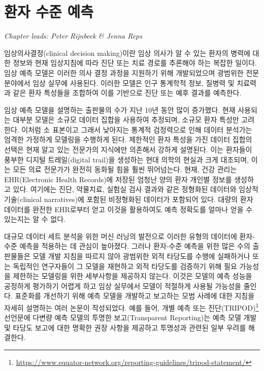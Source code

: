 \documentclass[10.5pt]{book}
\let\rmarkdownfootnote\footnote%
\def\footnote{\protect\rmarkdownfootnote}
\theoremstyle{definition}
\theoremstyle{definition}
\theoremstyle{definition}
\theoremstyle{remark}
\begin{document}
\chapter{환자 수준 예측}\label{PatientLevelPrediction}

\emph{Chapter leads: Peter Rijnbeek \& Jenna Reps}


임상의사결정(clinical decision making)이란 임상 의사가 알 수 있는 환자의
병력에 대한 정보와 현재 임상지침에 따라 진단 또는 치료 경로를 추론해야
하는 복잡한 일이다. 임상 예측 모델은 이러한 의사 결정 과정을 지원하기
위해 개발되었으며 광범위한 전문 분야에서 임상 실무에 사용된다. 이러한
모델은 인구 통계학적 정보, 질병력 및 치료력과 같은 환자 특성들을
조합하여 이를 기반으로 진단 또는 예후 결과를 예측한다.
 

임상 예측 모델을 설명하는 출판물의 수가 지난 10년 동안 많이 증가했다.
현재 사용되는 대부분 모델은 소규모 데이터 집합을 사용하여 추정되며,
소규모 환자 특성만 고려한다. 이처럼 소 표본이고 그래서 낮아지는 통계적
검정력으로 인해 데이터 분석가는 엄격한 가정하게 모델링을 수행하게 된다.
제한적인 환자 특성을 가진 데이터 집합의 선택은 현재 알고 있는 전문가의
지식에만 의존해서 강하게 설명된다. 이는 환자들이 풍부한 디지털
트레일(digital trail)을 생성하는 현대 의학의 현실과 크게 대조되며, 이는
모든 의료 전문가가 완전히 동화될 힘을 훨씬 뛰어넘는다. 현재, 건강 관리는
EHR(Electronic Health Records)에 저장된 엄청난 양의 환자 개인별 정보를
생성하고 있다. 여기에는 진단, 약물치료, 실험실 검사 결과와 같은 정형화된
데이터와 임상적 기술(clinical narratives)에 포함된 비정형화된 데이터가
포함되어 있다. 대량의 환자 데이터를 완전한 EHR로부터 얻고 이것을
활용하여도 예측 정확도를 얼마나 얻을 수 있는지는 알 수 없다.

대규모 데이터 세트 분석을 위한 머신 러닝의 발전으로 이러한 유형의
데이터에 환자-수준 예측을 적용하는 데 관심이 높아졌다. 그러나 환자-수준
예측을 위한 많은 수의 출판물들은 모델 개발 지침을 따르지 않아 광범위한
외적 타당도를 수행에 실패하거나 또는 독립적인 연구자들이 그 모델을
재현하고 외적 타당도를 검증하기 위해 필요 가능성을 제한하는 모델링을
위한 세부사항을 제공하지 않는다. 이것은 모델의 예측 성능을 공정하게
평가하기 어렵게 하고 임상 실무에서 모델이 적절하게 사용될 가능성을
줄인다. 표준화를 개선하기 위해 예측 모델을 개발하고 보고하는 모범 사례에
대한 지침을 자세히 설명하는 여러 논문이 작성되었다. 예를 들어, 개별 예측
또는 진단(TRIPOD)\footnote{\url{https://www.equator-network.org/reporting-guidelines/tripod-statement/}}
선언문에 다변량 예측 모델의 투명한 보고(Transparent Reporting)는 예측
모델 개발 및 타당도 보고에 대한 명확한 권장 사항을 제공하고 투명성과
관련된 일부 우려를 해결한다.  
\end{document}

